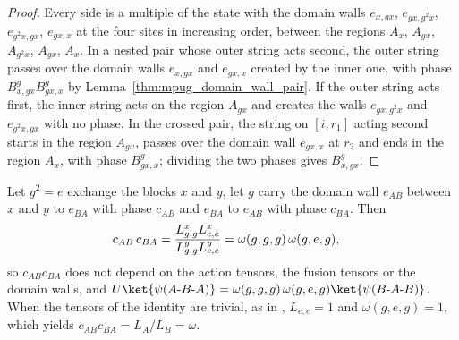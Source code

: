 \begin{proof}\leanok
    Every side is a multiple of the state with the domain walls $e_{x,gx}$,
    $e_{gx,g^2x}$, $e_{g^2x,gx}$, $e_{gx,x}$ at the four sites in increasing
    order, between the regions $A_x$, $A_{gx}$, $A_{g^2x}$, $A_{gx}$, $A_x$.
    In a nested pair whose outer string acts second, the outer string passes
    over the domain walls $e_{x,gx}$ and $e_{gx,x}$ created by the inner one,
    with phase $B^g_{x,gx}B^g_{gx,x}$ by
    Lemma~\ref{thm:mpug_domain_wall_pair}. If the outer string acts first,
    the inner string acts on the region $A_{gx}$ and creates the walls
    $e_{gx,g^2x}$ and $e_{g^2x,gx}$ with no phase. In the crossed pair, the
    string on $[i,r_1]$ acting second starts in the region $A_{gx}$, passes
    over the domain wall $e_{gx,x}$ at $r_2$ and ends in the region $A_x$,
    with phase $B^g_{gx,x}$; dividing the two phases gives $B^g_{x,gx}$.
\end{proof}

\begin{lemma}
    \label{thm:mpug_domain_wall_involution}
    \leanok
    Let $g^2=e$ exchange the blocks $x$ and $y$, let $g$ carry the domain wall
    $e_{AB}$ between $x$ and $y$ to $e_{BA}$ with phase $c_{AB}$ and
    $e_{BA}$ to $e_{AB}$ with phase $c_{BA}$. Then
    \begin{align}
        c_{AB}\,c_{BA}
         & =\frac{L^x_{g,g}L^x_{e,e}}{L^y_{g,g}L^y_{e,e}}
        =\omega(g,g,g)\,\omega(g,e,g),
        \notag
    \end{align}
    so $c_{AB}c_{BA}$ does not depend on the action tensors, the fusion
    tensors or the domain walls, and
    $U\ket{\psi(A\text{-}B\text{-}A)}=\omega(g,g,g)\,\omega(g,e,g)
        \ket{\psi(B\text{-}A\text{-}B)}$. When the tensors of the identity are
    trivial, as in \cite[Section~III.C]{GarreRubioSchuch2024DomainWall},
    $L_{e,e}=1$ and $\omega(g,e,g)=1$, which yields
    $c_{AB}c_{BA}=L_A/L_B=\omega$.
\end{lemma}

